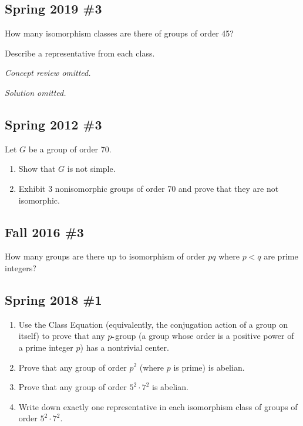 
\hypertarget{spring-2019-3}{%
\subsection{Spring 2019 \#3}\label{spring-2019-3}}

How many isomorphism classes are there of groups of order 45?

Describe a representative from each class.

\emph{Concept review omitted.}

\emph{Solution omitted.}


\hypertarget{spring-2012-3}{%
\subsection{Spring 2012 \#3}\label{spring-2012-3}}

Let \(G\) be a group of order 70.

\begin{enumerate}
\def\labelenumi{\alph{enumi}.}
\item
  Show that \(G\) is not simple.
\item
  Exhibit 3 nonisomorphic groups of order 70 and prove that they are not
  isomorphic.
\end{enumerate}

\hypertarget{fall-2016-3}{%
\subsection{Fall 2016 \#3}\label{fall-2016-3}}

How many groups are there up to isomorphism of order \(pq\) where
\(p<q\) are prime integers?

\hypertarget{spring-2018-1}{%
\subsection{Spring 2018 \#1}\label{spring-2018-1}}

\begin{enumerate}
\def\labelenumi{\alph{enumi}.}
\item
  Use the Class Equation (equivalently, the conjugation action of a
  group on itself) to prove that any \(p{\hbox{-}}\)group (a group whose
  order is a positive power of a prime integer \(p\)) has a nontrivial
  center.
\item
  Prove that any group of order \(p^2\) (where \(p\) is prime) is
  abelian.
\item
  Prove that any group of order \(5^2 \cdot 7^2\) is abelian.
\item
  Write down exactly one representative in each isomorphism class of
  groups of order \(5^2 \cdot 7^2\).
\end{enumerate}

